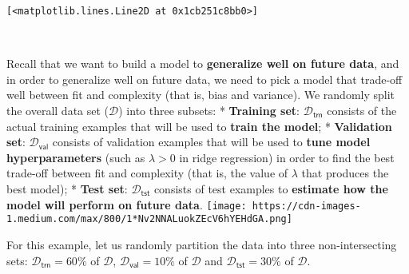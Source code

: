 \documentclass[11pt]{article}
\makeatletter
\newcommand{\boxspacing}{\kern\kvtcb@left@rule\kern\kvtcb@boxsep}
\newcommand{\prompt}[4]{
        {\ttfamily\llap{{\color{#2}[#3]:\hspace{3pt}#4}}\vspace{-\baselineskip}}
    }
\makeatother
\begin{document}
            \begin{tcolorbox}[breakable, size=fbox, boxrule=.5pt, pad at break*=1mm, opacityfill=0]
\prompt{Out}{outcolor}{3}{\boxspacing}
\begin{Verbatim}[commandchars=\\\{\}]
[<matplotlib.lines.Line2D at 0x1cb251c8bb0>]
\end{Verbatim}
\end{tcolorbox}
        
    \begin{center}
    \end{center}
    { \hspace*{\fill} \\}
    
    Recall that we want to build a model to \textbf{generalize well on
future data}, and in order to generalize well on future data, we need to
pick a model that trade-off well between fit and complexity (that is,
bias and variance). We randomly split the overall data set
(\(\mathcal{D}\)) into three subsets: * \textbf{Training set}:
\(\mathcal{D}_\mathsf{trn}\) consists of the actual training examples
that will be used to \textbf{train the model}; * \textbf{Validation
set}: \(\mathcal{D}_\mathsf{val}\) consists of validation examples that
will be used to \textbf{tune model hyperparameters} (such as
\(\lambda > 0\) in ridge regression) in order to find the best trade-off
between fit and complexity (that is, the value of \(\lambda\) that
produces the best model); * \textbf{Test set}:
\(\mathcal{D}_\mathsf{tst}\) consists of test examples to
\textbf{estimate how the model will perform on future data}.
\texttt{[image: https://cdn-images-1.medium.com/max/800/1*Nv2NNALuokZEcV6hYEHdGA.png]}

For this example, let us randomly partition the data into three
non-intersecting sets: \(\mathcal{D}_\mathsf{trn} = 60\%\) of
\(\mathcal{D}\), \(\mathcal{D}_\mathsf{val} = 10\%\) of \(\mathcal{D}\)
and \(\mathcal{D}_\mathsf{tst} = 30\%\) of \(\mathcal{D}\).
\end{document}
